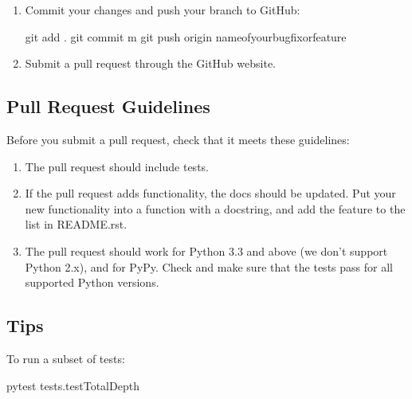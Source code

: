 \documentclass[letterpaper,10pt,english]{sphinxmanual}
\begin{document}
\begin{enumerate}
\item {} 
Commit your changes and push your branch to GitHub:

\begin{sphinxVerbatim}[commandchars=\\\{\}]
\PYGZdl{} git add .
\PYGZdl{} git commit \PYGZhy{}m 
\PYGZdl{} git push origin name\PYGZhy{}of\PYGZhy{}your\PYGZhy{}bugfix\PYGZhy{}or\PYGZhy{}feature
\end{sphinxVerbatim}

\item {} 
Submit a pull request through the GitHub website.

\end{enumerate}


\subsection{Pull Request Guidelines}
\label{\detokenize{contributing:pull-request-guidelines}}
Before you submit a pull request, check that it meets these guidelines:
\begin{enumerate}
\item {} 
The pull request should include tests.

\item {} 
If the pull request adds functionality, the docs should be updated. Put
your new functionality into a function with a docstring, and add the
feature to the list in README.rst.

\item {} 
The pull request should work for Python 3.3 and above (we don’t support Python 2.x), and for PyPy. Check
and make sure that the tests pass for all supported Python versions.

\end{enumerate}


\subsection{Tips}
\label{\detokenize{contributing:tips}}
To run a subset of tests:

\begin{sphinxVerbatim}[commandchars=\\\{\}]
\PYGZdl{} pytest tests.test\PYGZus{}TotalDepth
\end{sphinxVerbatim}
\end{document}
